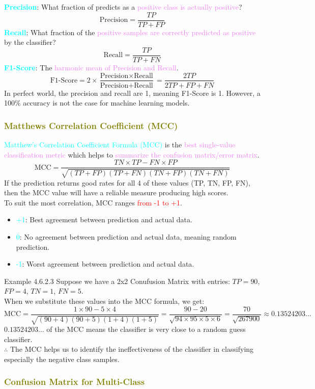 \documentclass{book}
\begin{document}
\textcolor{cyan}{\textbf{Precision}}: What fraction of predicts as a \textcolor{violet}{positive class is actually positive}?
\[
    \text{Precision} = \frac{TP}{TP + FP}
\]
\textcolor{cyan}{\textbf{Recall}}: What fraction of the \textcolor{violet}{positive samples are correctly predicted as positive} by the classifier?
\[
    \text{Recall} = \frac{TP}{TP + FN}
\]
\textcolor{cyan}{\textbf{F1-Score}}: The \textcolor{violet}{harmonic mean of Precision and Recall}.
\[
    \text{F1-Score} = 2 \times \frac{\text{Precision} \times \text{Recall}}{\text{Precision} + \text{Recall}} = \frac{2TP}{2TP + FP + FN}
\]
In perfect world, the precision and recall are 1, meaning F1-Score is 1. However, a 100\% accuracy is not the case for machine learning models.\\
\newpage
\textcolor{olive}{\subsubsection{Matthews Correlation Coefficient (MCC)}}
\textcolor{cyan}{Matthew's Correlation Coefficient Formula (MCC)} is the \textcolor{violet}{best single-value classification metric} which helps to \textcolor{violet}{summarize the confusion matrix/error matrix}.\\
\[
    \text{MCC} = \frac{TN \times TP - FN \times FP}{\sqrt{(TP + FP)(TP + FN)(TN + FP)(TN + FN)}}
\]
If the prediction returns good rates for all 4 of these values (TP, TN, FP, FN), then the MCC value will have a reliable measure producing high scores.\\
To suit the most correlation, MCC ranges \textcolor{red}{from -1 to +1}.\\
\begin{itemize}
    \item \textcolor{cyan}{+1}: Best agreement between prediction and actual data.
    \item \textcolor{cyan}{0}: No agreement between prediction and actual data, meaning random prediction.
    \item \textcolor{cyan}{-1}: Worst agreement between prediction and actual data.
\end{itemize}
\begin{egBox}{Example 4.6.2.3}{}
    Suppose we have a 2x2 Conufusion Matrix with entries: \(TP = 90\), \(FP = 4\), \(TN = 1\), \(FN = 5\).\\
    When we substitute these values into the MCC formula, we get:
    \[
        \text{MCC} = \frac{1 \times 90 - 5 \times 4}{\sqrt{(90 + 4)(90 + 5)(1 + 4)(1 + 5)}} = \frac{90 - 20}{\sqrt{94 \times 95 \times 5 \times 6}} = \frac{70}{\sqrt{267900}} \approx 0.13524203\ldots
    \]
    \(0.13524203\ldots\) of the MCC means the classifier is very close to a random guess classifier.\\
    $\therefore$ The MCC helps us to identify the ineffectiveness of the classifier in classifying especially the negative class samples.
\end{egBox}
\textcolor{olive}{\subsubsection{Confusion Matrix for Multi-Class}}
\end{document}
